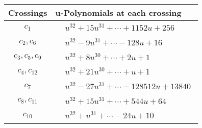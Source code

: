 \documentclass[1p]{elsarticle_modified}
\theoremstyle{definition}
\begin{document}
\begin{tabular}{m{50pt}|m{274pt}}
Crossings & \hspace{64pt}u-Polynomials at each crossing \\
\hline $$\begin{aligned}c_{1}\end{aligned}$$&$\begin{aligned}
&u^{32}+15 u^{31}+\cdots+1152 u+256
\end{aligned}$\\
\hline $$\begin{aligned}c_{2},c_{6}\end{aligned}$$&$\begin{aligned}
&u^{32}-9 u^{31}+\cdots-128 u+16
\end{aligned}$\\
\hline $$\begin{aligned}c_{3},c_{5},c_{9}\end{aligned}$$&$\begin{aligned}
&u^{32}+8 u^{30}+\cdots+2 u+1
\end{aligned}$\\
\hline $$\begin{aligned}c_{4},c_{12}\end{aligned}$$&$\begin{aligned}
&u^{32}+21 u^{30}+\cdots+u+1
\end{aligned}$\\
\hline $$\begin{aligned}c_{7}\end{aligned}$$&$\begin{aligned}
&u^{32}-27 u^{31}+\cdots-128512 u+13840
\end{aligned}$\\
\hline $$\begin{aligned}c_{8},c_{11}\end{aligned}$$&$\begin{aligned}
&u^{32}+15 u^{31}+\cdots+544 u+64
\end{aligned}$\\
\hline $$\begin{aligned}c_{10}\end{aligned}$$&$\begin{aligned}
&u^{32}+u^{31}+\cdots-24 u+10
\end{aligned}$\\
\hline
\end{tabular}\\~\\
\newpage\renewcommand{\arraystretch}{1}
\end{document}
